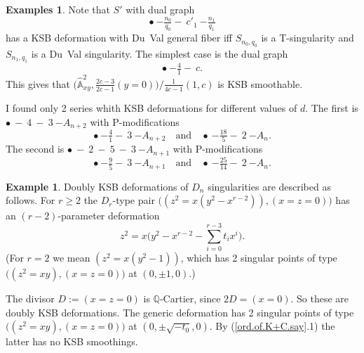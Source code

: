 \documentclass{amsart}
\theoremstyle{definition}
\newtheorem{exmp}[thm]{Example}
\newtheorem{exmps}[thm]{Examples}
\theoremstyle{remark}
\renewcommand{\a}[0]{\hat{\mathbb A}}
\newcommand{\q}[0]{{\mathbb Q}}
\newcommand{\qtq}[1]{\quad\mbox{#1}\quad}
\newcommand{\tsum}[0]{\textstyle{\sum}}
\begin{document}
   
 
     
   


    
 


\begin{exmps} \label{4.0.smooth.exmp}
  Note that $S'$ with dual graph %
$$
   \bullet \ {-\boxed{\tfrac{n_0}{q_0}}-} \  c'_1 \  {-\boxed{\tfrac{n_1}{q_1}}}
   $$
  has a KSB deformation with Du~Val general fiber iff $S_{n_0, q_0}$ is a T-singularity and
   $S_{n_1, q_1}$ is a  Du~Val singularity. 
The simplest case  is the dual graph
     $$
   \bullet\ {-\boxed{\tfrac{4}{1}}-} \  c. 
    $$
   This gives that
   $
   \bigl(\a^2_{xy},\tfrac{2c-3}{2c-1}(y=0)\bigr) /\tfrac{1}{4c-1}(1, c)
     $
   is KSB smoothable.

   I found only 2 series whith KSB deformations for different values of $d$. The first is
   $ \bullet\ - \ 4\ - \  3  \ {-\boxed{A_{n+2}}}$
with P-modifications 
   $$
   \bullet\ {-\boxed{\tfrac{4}{1}}-} \  3  \ {-\boxed{A_{n+2}}}
   \qtq{and} 
   \bullet\ {-\boxed{\tfrac{18}{5}}-} \  2  \ {-\boxed{A_{n}}}.
   $$
  The second is  $ \bullet\ - \ 2\ - \ 5\ - \  3  \ {-\boxed{A_{n+1}}}$
with P-modifications 
   $$
   \bullet\ {-\boxed{\tfrac{9}{5}}-} \  3  \ {-\boxed{A_{n+1}}}
   \qtq{and} 
   \bullet\ {-\boxed{\tfrac{25}{14}}-} \  2  \ {-\boxed{A_{n}}}.
   $$
   \end{exmps}



\begin{exmp} \label{D.term.QC.exmp.1} Doubly KSB deformations of $D_n$ singularities are described as follows.
  For $r\geq 2$ the $D_r$-type
  pair
  $\bigl((z^2=x(y^2-x^{r-2})), (x=z=0)\bigr)$ has an 
$(r{-}2)$-parameter deformation 
  $$
  z^2=x\bigl(y^2-x^{r-2}-\tsum_{i=0}^{r-3} t_i x^i\bigr).
  $$
  (For $r=2$ we mean $(z^2=x(y^2-1))$, which has 2 singular points of type
  $\bigl((z^2=xy), (x=z=0)\bigr)$ at $(0, \pm 1, 0)$.)
  
  The divisor  $D:=(x=z=0)$ is $\q$-Cartier, since $2D=(x=0)$.
  So these are doubly KSB deformations.
The generic deformation  has 2 singular points of type
  $\bigl((z^2=xy), (x=z=0)\bigr)$ at   $(0,\pm \sqrt{-t_0}, 0)$.
  By (\ref{ord.of.K+C.say}.1) the latter has no KSB smoothings.
  \end{exmp}
\end{document}
